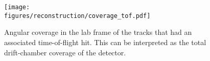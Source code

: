 \begin{figure}\begin{center}
\texttt{[image: \\figures/reconstruction/coverage\_tof.pdf]}
\caption[Time-of-Flight Angular Coverage]{\label{fig:clas.tof.coverage}{}Angular coverage in the lab frame of the tracks that had an associated time-of-flight hit. This can be interpreted as the total drift-chamber coverage of the  detector.}
\end{center}\end{figure}
